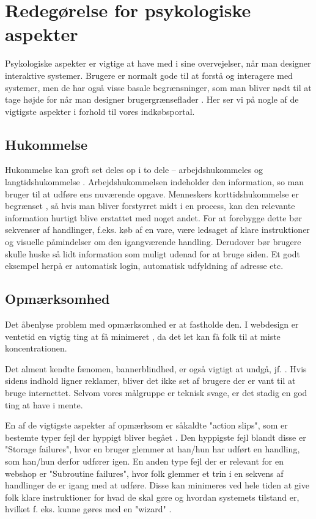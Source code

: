 \section{Redegørelse for psykologiske aspekter}

Psykologiske aspekter er vigtige at have med i sine overvejelser, når man
designer interaktive systemer. Brugere er normalt gode til at forstå og
interagere med systemer, men de har også visse basale begrænsninger, som
man bliver nødt til at tage højde for når man designer brugergrænseflader
\cite[s. 531]{Benyon2010}. Her ser vi på nogle af de vigtigste aspekter i
forhold til vores indkøbsportal.

\subsection{Hukommelse}
Hukommelse kan groft set deles op i to dele -- arbejdshukommeles og
langtidshukommelse \cite[s. 536]{Benyon2010}. Arbejdshukommelsen indeholder
den information, so man bruger til at udføre ens nuværende opgave.
Menneskers korttidshukommelse er begrænset \cite[s. 536]{Benyon2010}, så
hvis man bliver forstyrret midt i en process, kan den relevante information
hurtigt blive erstattet med noget andet. For at forebygge dette bør sekvenser
af handlinger, f.eks. køb af en vare, være ledsaget af klare instruktioner
og visuelle påmindelser om den igangværende handling. Derudover bør brugere
skulle huske så lidt information som muligt udenad for at bruge siden. Et
godt eksempel herpå er automatisk login, automatisk udfyldning af adresse
etc.

\subsection{Opmærksomhed}
Det åbenlyse problem med opmærksomhed er at fastholde den. I webdesign er
ventetid en vigtig ting at få minimeret \cite[box 22.7]{Benyon2010}, da det
let kan få folk til at miste koncentrationen.

Det alment kendte fænomen, bannerblindhed, er også vigtigt at undgå, jf.
\cite{Grue}. Hvis sidens indhold ligner reklamer, bliver det ikke set af
brugere der er vant til at bruge internettet. Selvom vores målgruppe er
teknisk svage, er det stadig en god ting at have i mente.

En af de vigtigste aspekter af opmærksom er såkaldte "action slips", som er bestemte typer fejl
der hyppigt bliver begået \cite[s. 553]{Benyon2010}. Den hyppigste fejl blandt disse er "Storage failures",
hvor en bruger glemmer at han/hun har udført en handling, som han/hun derfor udfører igen. En anden type fejl
der er relevant for en webshop er "Subroutine failures", hvor folk glemmer et trin i en sekvens af handlinger
de er igang med at udføre. Disse kan minimeres ved hele tiden at give folk klare instruktioner for hvad de
skal gøre og hvordan systemets tilstand er, hvilket f. eks. kunne gøres med en "wizard" \cite[s. 553]{Benyon2010}.

